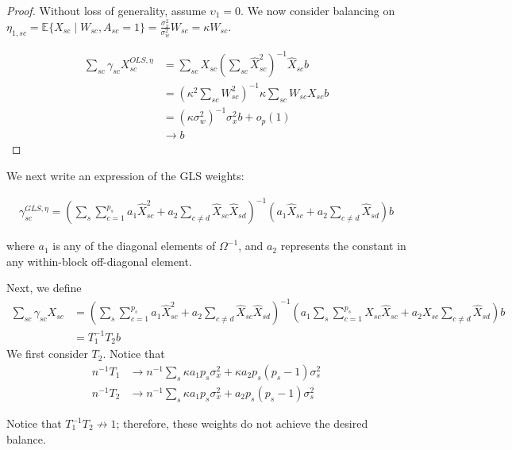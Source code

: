 \begin{proof}
Without loss of generality, assume $\upsilon_1 = 0$. We now consider balancing on $\eta_{1, sc} = \mathbb{E}\{X_{sc} \mid W_{sc}, A_{sc} = 1\} = \frac{\sigma^2_x}{\sigma^2_w}W_{sc} = \kappa W_{sc}$. 

    \begin{align*}
        \sum_{sc} \gamma_{sc} X_{sc}^{OLS, \eta} &= \sum_{sc} X_{sc} (\sum_{sc} \hat{X}_{sc}^2)^{-1}\hat{X}_{sc}b \\
        &= (\kappa^2 \sum_{sc} W_{sc}^2)^{-1}\kappa \sum_{sc}W_{sc}X_{sc}b \\
        &= (\kappa \sigma^2_w)^{-1}\sigma^2_xb + o_p(1) \\
        &\to b
    \end{align*}
\end{proof}

We next write an expression of the GLS weights:

\begin{align*}
\gamma_{sc}^{GLS, \eta} = (\sum_{s}\sum_{c=1}^{p_s} a_1 \hat{X}_{sc}^2 + a_2 \sum_{c\ne d} \hat{X}_{sc}\hat{X}_{sd})^{-1}(a_1\hat{X}_{sc} + a_2\sum_{c\ne d} \hat{X}_{sd})b
\end{align*}

where $a_1$ is any of the diagonal elements of $\Omega^{-1}$, and $a_2$ represents the constant in any within-block off-diagonal element. 

Next, we define 
    \begin{align*}
        \sum_{sc} \gamma_{sc} X_{sc} &= (\sum_{s}\sum_{c=1}^{p_s} a_1 \hat{X}_{sc}^2 + a_2 \sum_{c\ne d} \hat{X}_{sc}\hat{X}_{sd})^{-1}(a_1\sum_{s}\sum_{c=1}^{p_s}X_{sc}\hat{X}_{sc} + a_2X_{sc}\sum_{c\ne d} \hat{X}_{sd})b \\
        &= T_1^{-1}T_2b
    \end{align*}
    We first consider $T_2$. Notice that
    \begin{align*}
        n^{-1}T_1 &\to n^{-1}\sum_s \kappa a_1 p_s\sigma^2_x + \kappa a_2 p_s(p_s - 1)\sigma^2_s\\
        n^{-1}T_2 &\to n^{-1}\sum_s \kappa a_1 p_s\sigma^2_x + a_2p_s(p_s - 1)\sigma^2_s
    \end{align*}
    
    Notice that $T_1^{-1}T_2 \not\to 1$; therefore, these weights do not achieve the desired balance.


